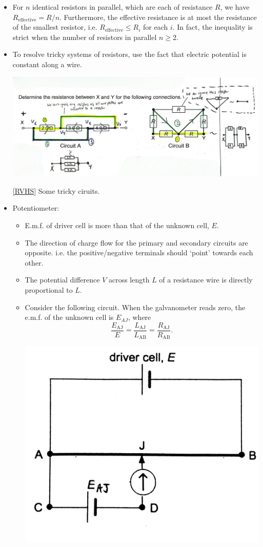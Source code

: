 \documentclass[oneside]{book}
\begin{document}
\begin{itemize}
    \item For \(n\) identical resistors in parallel, which are each of resistance \(R\), we have \(R_{\text{effective}}=R/n\). Furthermore, the effective resistance is at most the resistance of the smallest resistor, i.e. \(R_{\text{effective}}\leq R_i\) for each \(i\). In fact, the inequality is strict when the number of resistors in parallel \(n\geq 2\).
    \item To resolve tricky systems of resistors, use the fact that electric potential is constant along a wire.
    \begin{center}
        \includegraphics[width=0.93\columnwidth]{../images/DC-Circuits-Resistors.jpg}
        \captionsetup{type=figure}
        \caption[figure]{\ref{RVHS} Some tricky ciruits.}
    \end{center}
    \item Potentiometer:
    \begin{itemize}
        \item E.m.f. of driver cell is more than that of the unknown cell, \(E\).
        \item The direction of charge flow for the primary and secondary circuits are opposite. i.e. the positive/negative terminals should `point' towards each other.
        \item The potential difference \(V\) across length \(L\) of a resistance wire is directly proportional to \(L\).
        \item Consider the following circuit. When the galvanometer reads zero, the e.m.f. of the unknown cell is \(E_{AJ}\), where 
        \[\frac{E_{\text{AJ}}}{E}=\frac{L_{\text{AJ}}}{L_{\text{AB}}}=\frac{R_{\text{AJ}}}{R_{\text{AB}}}.\]
        \begin{center}
            \includegraphics[width=0.4\columnwidth]{../images/DC-Circuits-Potentiometer-1.jpg}

\end{center}
\end{itemize}
\end{itemize}
\end{document}
